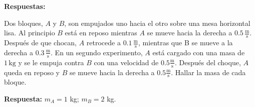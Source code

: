 \documentclass[addpoints]{exam}
\newcommand{\un}[1]{\text{#1}}
\newcommand{\rta}{\textbf{Respuesta: }}
\newcommand{\rtas}{\textbf{Respuestas: }}
\begin{document}
\begin{questions}
    \rtas




    \question Dos bloques, $A$ y $B$, son empujados uno hacia el otro sobre una mesa horizontal lisa. Al principio $B$ está en reposo mientras $A$ se mueve hacia la derecha a $0.5 \, \frac{\un{m}}{\un{s}}$. Después de que chocan, $A$ retrocede a $0.1 \, \frac{\un{m}}{\un{s}}$, mientras que B se mueve a la derecha a $0.3 \, \frac{\un{m}}{\un{s}}$. En un segundo experimento, $A$ está cargado con una masa de $1 \, \un{kg}$ y se le empuja contra $B$ con una velocidad de $0.5 \frac{\un{m}}{\un{s}}$. Después del choque, $A$ queda en reposo y $B$ se mueve hacia la derecha a $0.5 \frac{\un{m}}{\un{s}}$. Hallar la masa de cada bloque.

    \rta $m_A = 1$ kg; $m_B = 2$ kg.



\end{questions}
\end{document}
